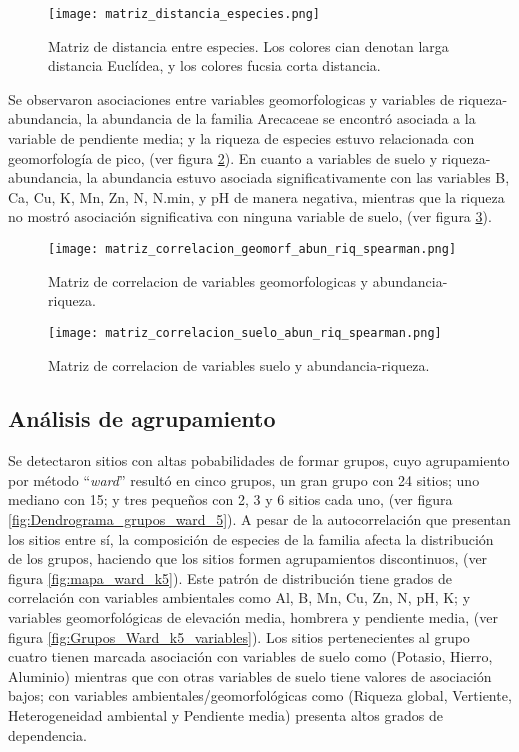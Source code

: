 \documentclass[11pt,]{article}
\begin{document}
\begin{figure}
\centering
\texttt{[image: matriz\_distancia\_especies.png]}
\caption{Matriz de distancia entre especies. Los colores cian denotan
larga distancia Euclídea, y los colores fucsia corta distancia.
\label{fig:matriz_distancia_especies}}
\end{figure}

Se observaron asociaciones entre variables geomorfologicas y variables
de riqueza-abundancia, la abundancia de la familia Arecaceae se encontró
asociada a la variable de pendiente media; y la riqueza de especies
estuvo relacionada con geomorfología de pico, (ver figura
\ref{fig:matriz_correlacion_geomorf_abun_riq_spearman}). En cuanto a
variables de suelo y riqueza-abundancia, la abundancia estuvo asociada
significativamente con las variables B, Ca, Cu, K, Mn, Zn, N, N.min, y
pH de manera negativa, mientras que la riqueza no mostró asociación
significativa con ninguna variable de suelo, (ver figura
\ref{fig:matriz_correlacion_suelo_abun_riq_spearman}).

\begin{figure}
\centering
\texttt{[image: matriz\_correlacion\_geomorf\_abun\_riq\_spearman.png]}
\caption{Matriz de correlacion de variables geomorfologicas y
abundancia-riqueza.
\label{fig:matriz_correlacion_geomorf_abun_riq_spearman}}
\end{figure}

\begin{figure}
\centering
\texttt{[image: matriz\_correlacion\_suelo\_abun\_riq\_spearman.png]}
\caption{Matriz de correlacion de variables suelo y abundancia-riqueza.
\label{fig:matriz_correlacion_suelo_abun_riq_spearman}}
\end{figure}

\subsection{Análisis de
agrupamiento}\label{anuxe1lisis-de-agrupamiento-1}

Se detectaron sitios con altas pobabilidades de formar grupos, cuyo
agrupamiento por método ``\emph{ward}'' resultó en cinco grupos, un gran
grupo con 24 sitios; uno mediano con 15; y tres pequeños con 2, 3 y 6
sitios cada uno, (ver figura \ref{fig:Dendrograma_grupos_ward_5}). A
pesar de la autocorrelación que presentan los sitios entre sí, la
composición de especies de la familia afecta la distribución de los
grupos, haciendo que los sitios formen agrupamientos discontinuos, (ver
figura \ref{fig:mapa_ward_k5}). Este patrón de distribución tiene grados
de correlación con variables ambientales como Al, B, Mn, Cu, Zn, N, pH,
K; y variables geomorfológicas de elevación media, hombrera y pendiente
media, (ver figura \ref{fig:Grupos_Ward_k5_variables}). Los sitios
pertenecientes al grupo cuatro tienen marcada asociación con variables
de suelo como (Potasio, Hierro, Aluminio) mientras que con otras
variables de suelo tiene valores de asociación bajos; con variables
ambientales/geomorfológicas como (Riqueza global, Vertiente,
Heterogeneidad ambiental y Pendiente media) presenta altos grados de
dependencia.
\end{document}
